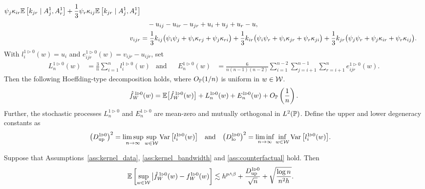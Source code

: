 \begin{lemma}
\begin{align*}
    \psi_j \kappa_{ir}
    \E\left[
      k_{jr}
      \mid A_j^1, A_r^1 \right]
    +
    \frac{1}{3}
    \psi_r \kappa_{ij}
    \E\left[
      k_{jr}
      \mid A_j^1, A_r^1 \right] \\
    &\quad-
    u_{ij} - u_{ir} - u_{jr}
    + u_i + u_j + u_r
    - u, \\
    v_{ijr}
    &=
    \frac{1}{3}
    k_{ij} \big(\psi_i \psi_j +\psi_i \kappa_{r j} +\psi_j \kappa_{r i} \big)
    + \frac{1}{3}
    k_{ir} \big(\psi_i \psi_r +\psi_i \kappa_{jr} +\psi_r \kappa_{ji} \big)
    + \frac{1}{3}
    k_{jr} \big(\psi_j \psi_r +\psi_j \kappa_{ir} +\psi_r \kappa_{ij} \big).
  \end{align*}
  With $l_i^{1 \triangleright 0}(w) = u_i$
  and $e_{ijr}^{1 \triangleright 0}(w) = v_{ijr} - u_{ijr}$,
  set
  \begin{align*}
    L_n^{1 \triangleright 0}(w)
    &=
    \frac{3}{n} \sum_{i=1}^n
    l_i^{1 \triangleright 0}(w)
    &\text{and}                 &
    &E_n^{1 \triangleright 0}(w)
    &=
    \frac{6}{n(n-1)(n-2)}
    \sum_{i=1}^{n-2}
    \sum_{j=i+1}^{n-1}
    \sum_{r=i+1}^n
    e_{ijr}^{1 \triangleright 0}(w).
  \end{align*}
  Then the following Hoeffding-type decomposition holds,
  where $O_\P(1/n)$ is uniform in $w \in \cW$.
  \begin{align*}
    \hat f_W^{\,1 \triangleright 0}(w)
    = \E\big[\hat f_W^{\,1 \triangleright 0}(w)\big]
    + L_n^{1 \triangleright 0}(w)
    + E_n^{1 \triangleright 0}(w)
    + O_\P\left( \frac{1}{n} \right).
  \end{align*}
  Further,
  the stochastic processes
  $L_n^{1 \triangleright 0}$
  and $E_n^{1 \triangleright 0}$
  are mean-zero
  and mutually orthogonal
  in $L^2(\P)$.
  Define the upper and lower degeneracy constants as
  \begin{align*}
    \left(
      \Du^{1 \triangleright 0}
    \right)^2
    &=
    \limsup_{n \to \infty}
    \sup_{w \in \cW}
    \Var\big[
    l_i^{1 \triangleright 0}(w)
    \big]
    &\text{and}&
    &
    \left(
      \Dl^{1 \triangleright 0}
    \right)^2
    &=
    \liminf_{n \to \infty}
    \inf_{w \in \cW}
    \Var\big[
    l_i^{1 \triangleright 0}(w)
    \big].
  \end{align*}

\end{lemma}

\begin{lemma}
  \label{lem:counterfactual_uniform_consistency}

  Suppose that Assumptions~\ref{ass:kernel_data},
  \ref{ass:kernel_bandwidth} and \ref{ass:counterfactual} hold.
  Then
  \begin{align*}
    \E\left[
      \sup_{w \in \cW}
      \big|\hat f_W^{\,1 \triangleright 0}(w)
      - f_W^{1 \triangleright 0}(w)
    \right]
    &\lesssim
    h^{p \wedge \beta}
    + \frac{\Du^{1 \triangleright 0}}{\sqrt n}
    + \sqrt{\frac{\log n}{n^2h}}.
  \end{align*}

\end{lemma}

